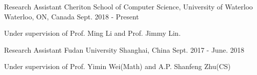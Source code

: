 

\begin{cventries}

  \cventry
    {Research Assistant} %
    {Cheriton School of Computer Science, University of Waterloo} %
    {Waterloo, ON, Canada} %
    {Sept. 2018 - Present} %
    {
      \begin{cvitems} %
        \item {Under supervision of Prof. Ming Li and Prof. Jimmy Lin.}
      \end{cvitems}
    }
     \cventry
    {Research Assistant} %
    {Fudan University} %
    {Shanghai, China} %
    {Sept. 2017 - June. 2018} %
    {
      \begin{cvitems} %
	\item {Under supervision of Prof. Yimin Wei(Math) and A.P. Shanfeng Zhu(CS) }
      \end{cvitems}
    }
    
\end{cventries}
